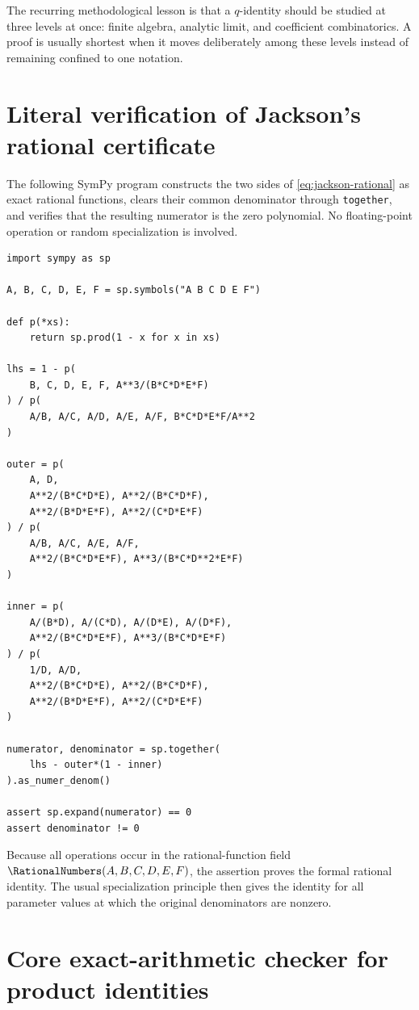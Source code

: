 \documentclass[11pt,oneside]{article}
\theoremstyle{definition}
\begin{document}
The recurring methodological lesson is that a $q$-identity should be studied
at three levels at once: finite algebra, analytic limit, and coefficient
combinatorics.  A proof is usually shortest when it moves deliberately among
these levels instead of remaining confined to one notation.


\clearpage
\appendix

\section{Literal verification of Jackson's rational certificate}
\label{app:certificate}

The following SymPy program constructs the two sides of
\eqref{eq:jackson-rational} as exact rational functions, clears their common
denominator through \texttt{together}, and verifies that the resulting
numerator is the zero polynomial.  No floating-point operation or random
specialization is involved.

\begingroup
\scriptsize
\begin{verbatim}
import sympy as sp

A, B, C, D, E, F = sp.symbols("A B C D E F")

def p(*xs):
    return sp.prod(1 - x for x in xs)

lhs = 1 - p(
    B, C, D, E, F, A**3/(B*C*D*E*F)
) / p(
    A/B, A/C, A/D, A/E, A/F, B*C*D*E*F/A**2
)

outer = p(
    A, D,
    A**2/(B*C*D*E), A**2/(B*C*D*F),
    A**2/(B*D*E*F), A**2/(C*D*E*F)
) / p(
    A/B, A/C, A/E, A/F,
    A**2/(B*C*D*E*F), A**3/(B*C*D**2*E*F)
)

inner = p(
    A/(B*D), A/(C*D), A/(D*E), A/(D*F),
    A**2/(B*C*D*E*F), A**3/(B*C*D*E*F)
) / p(
    1/D, A/D,
    A**2/(B*C*D*E), A**2/(B*C*D*F),
    A**2/(B*D*E*F), A**2/(C*D*E*F)
)

numerator, denominator = sp.together(
    lhs - outer*(1 - inner)
).as_numer_denom()

assert sp.expand(numerator) == 0
assert denominator != 0
\end{verbatim}
\endgroup

Because all operations occur in the rational-function field
$\RationalNumbers(A,B,C,D,E,F)$, the assertion proves the formal rational identity.  The
usual specialization principle then gives the identity for all parameter
values at which the original denominators are nonzero.


\section{Core exact-arithmetic checker for product identities}
\label{app:checker}
\end{document}
